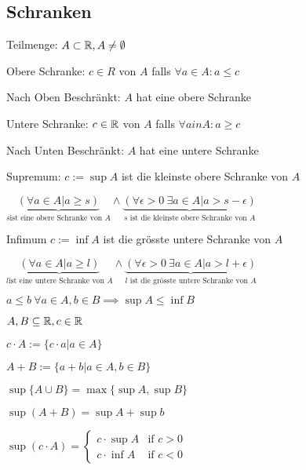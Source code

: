 \subsection{Schranken}
\begin{compactdesc}
    \item[Teilmenge:] $A \subset \mathbb{R}, A \neq \emptyset$
    \item[Obere Schranke:] $c \in R$ von $A$ falls  $\forall a \in A: a \le c$
    \item[Nach Oben Beschränkt:] $A$ hat eine obere Schranke
    \item[Untere Schranke:] $c \in \mathbb{R}$ von $A$ falls $\forall a in A: a \ge c$
    \item[Nach Unten Beschränkt:] $A$ hat eine untere Schranke
    \item[Supremum:] $c:= \sup A$ ist die kleinste obere Schranke von $A$
    \item $\underbrace{\left( \forall a \in  A | a \ge  s \right)}_{s \text{ist eine obere Schranke von } A} \wedge \underbrace{\left( \forall  \epsilon > 0 \ \exists a \in A | a > s - \epsilon \right)}_{s \text{ ist die kleinste obere Schranke von } A}  $
    \item[Infimum] $c:= \inf A$ ist die grösste untere Schranke von $A$
    \item $\underbrace{\left( \forall a \in  A | a \ge  l \right)}_{l \text{ist eine untere Schranke von } A} \wedge \underbrace{\left( \forall  \epsilon > 0 \ \exists a \in A | a > l + \epsilon \right)}_{l \text{ ist die grösste untere Schranke von } A}  $
\end{compactdesc}

\begin{compactitem}
    \item $a \le b \ \forall a \in A, b \in B \implies \sup A \le \inf B$
    \item $A, B \subseteq \mathbb{R}, c \in \mathbb{R}$
        \begin{compactitem}
            \item $c \cdot A := \{c \cdot  a | a \in  A\} $
            \item $A + B := \{a + b | a \in A, b \in B\} $
        \end{compactitem}
    \item $\sup \{A \cup B\} = \max \{\sup A, \sup B\}  $
    \item $\sup \left( A + B \right) = \sup A + \sup b $
    \item $\sup \left( c \cdot A \right) = \begin{cases}
        c \cdot \sup A & \text{if } c > 0\\
        c \cdot \inf A & \text{if } c < 0
    \end{cases} $
\end{compactitem}

